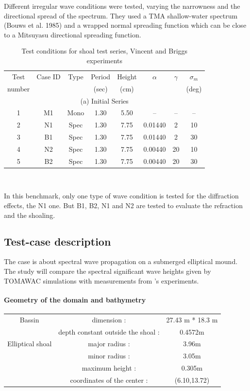 Different irregular wave conditions were tested, varying the narrowness and the directional spread of the spectrum. They used a TMA shallow-water spectrum (Bouws et al. 1985) and a wrapped normal spreading function which can be close to a Mitsuyasu directional spreading function.\\
\begin{table}

\begin{tabular}{|c|c|c|c|c|c|c|c|}
\hline
\hline
Test & Case ID& Type&Period & Height & $\alpha$& $\gamma$& $\sigma _m$ \\
 number& & & (sec)&  (cm)& & & (deg)\\
\hline
\multicolumn{8}{|c|}{(a) Initial Series}\\
\hline
1 & M1 & Mono & 1.30 & 5.50 & -- & -- & -- \\
2 & N1 & Spec & 1.30 & 7.75 & 0.01440 & 2 & 10\\
3 & B1 & Spec & 1.30 & 7.75 & 0.01440 & 2 & 30\\
4 & N2 & Spec & 1.30 & 7.75 & 0.00440 & 20 & 10\\
5 & B2 & Spec & 1.30 & 7.75 & 0.00440 & 20 & 30\\
\hline
\end{tabular} \\
\caption{Test conditions for shoal test series, Vincent and Briggs experiments}
\label{setupVB}
\end{table}

In this benchmark, only one type of wave condition is tested for the diffraction effects, the N1 one. But B1, B2, N1 and N2 are tested to evaluate the refraction and the shoaling.

\subsection{Test-case description}
The case is about spectral wave propagation on a submerged elliptical mound. The study will compare the spectral significant wave heights given by TOMAWAC simulations with measurements from \cite{Vincent1989}'s experiments.
\paragraph{Geometry of the domain and bathymetry}

\begin{tabular}{ccc}
Bassin & dimension :& 27.43 m * 18.3 m\\
 &depth constant outside the shoal :& 0.4572m\\
\hline
Elliptical shoal & major radius :& 3.96m\\
 & minor radius :& 3.05m\\
  & maximum height :& 0.305m\\
  & coordinates of the center :& (6.10,13.72)
\end{tabular}

